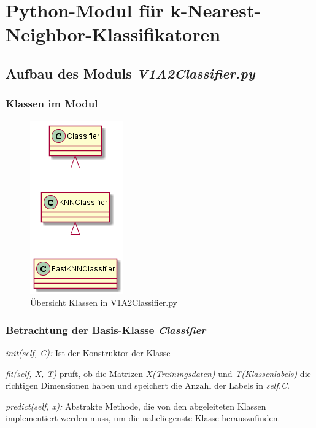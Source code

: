 \section{Python-Modul für k-Nearest-Neighbor-Klassifikatoren}


\subsection{Aufbau des Moduls \textit{V1A2\textunderscore Classifier.py}}

\subsubsection{Klassen im Modul}

\begin{figure}[H]
    \centering
    \includegraphics[width=0.3\linewidth]{files/classifier.png}
    \caption{Übersicht Klassen in V1A2\textunderscore Classifier.py}
\end{figure}

\subsubsection{Betrachtung der Basis-Klasse \textit{Classifier}}

\textit{\textunderscore\textunderscore init\textunderscore\textunderscore(self, C):} Ist der Konstruktor der Klasse

\noindent
\textit{fit(self, X, T)} prüft, ob die Matrizen \textit{X(Trainingsdaten)} und \textit{T(Klassenlabels)} die richtigen Dimensionen haben und speichert die Anzahl der Labels in \textit{self.C}.

\noindent
\textit{predict(self, x):} Abstrakte Methode, die von den abgeleiteten Klassen implementiert werden muss, um die naheliegenste Klasse herauszufinden.

